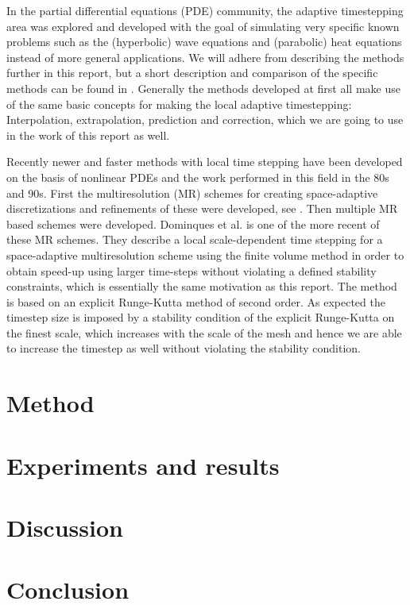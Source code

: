 \documentclass[11pt,a4paper]{article}
\begin{document}
In the partial differential equations (PDE) community, the adaptive
timestepping area was explored and developed with the goal of simulating
very specific known problems such as the (hyperbolic) wave equations
and (parabolic) heat equations instead of more general applications. We
will adhere from describing the methods further in this report, but a
short description and comparison of the specific methods can be found in
\cite{Gander:2013}. Generally the methods developed at first all make use
of the same basic concepts for making the local adaptive timestepping:
Interpolation, extrapolation, prediction and correction, which we are going to
use in the work of this report as well.

Recently newer and faster methods with local time stepping have been
developed on the basis of nonlinear PDEs and the work performed in this
field in the 80s and 90s. First the multiresolution (MR) schemes for creating
space-adaptive discretizations and refinements of these were developed,
see \cite{Berger:1984}. Then multiple MR based schemes were developed.
Dominques et al. \cite{Domingues:2008} is one of the more recent of these MR
schemes. They describe a local scale-dependent time stepping
for a space-adaptive multiresolution scheme using the finite volume method
in order to obtain speed-up using larger time-steps without violating a
defined stability constraints, which is essentially the same motivation as
this report. The method is based on an explicit Runge-Kutta method of second
order. As expected the timestep size is imposed by a stability condition of
the explicit Runge-Kutta on the finest scale, which increases with the scale
of the mesh and hence we are able to increase the timestep as well without
violating the stability condition.

\section{Method}

\section{Experiments and results}

\section{Discussion}

\section{Conclusion}


\cite{Keshav:2007}


\end{document}
